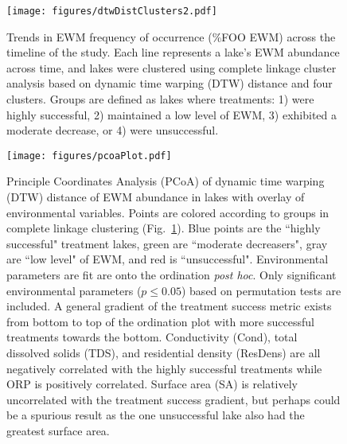 \documentclass{article}
\begin{document}
\begin{figure}[h]
	\centering
	\texttt{[image: figures/dtwDistClusters2.pdf]}
	\captionsetup{justification=raggedright}
	\caption{Trends in EWM frequency of occurrence (\%FOO EWM) across the timeline of the study. Each line represents a lake's EWM abundance across time, and lakes were clustered using complete linkage cluster analysis based on dynamic time warping (DTW) distance and four clusters. Groups are defined as lakes where treatments: 1) were highly successful, 2) maintained a low level of EWM, 3) exhibited a moderate decrease, or 4) were unsuccessful.}
	\label{fig:distClusters}
\end{figure}

\begin{figure}[h]
	\centering
	\texttt{[image: figures/pcoaPlot.pdf]}
	\captionsetup{justification=raggedright}
	\caption{Principle Coordinates Analysis (PCoA) of dynamic time warping (DTW) distance of EWM abundance in lakes with overlay of environmental variables. Points are colored according to groups in complete linkage clustering (Fig.~\ref{fig:distClusters}). Blue points are the ``highly successful" treatment lakes, green are ``moderate decreasers", gray are ``low level" of EWM, and red is ``unsuccessful". Environmental parameters are fit are onto the ordination \emph{post hoc}. Only significant environmental parameters ($p\leq0.05$) based on permutation tests are included. A general gradient of the treatment success metric exists from bottom to top of the ordination plot with more successful treatments towards the bottom. Conductivity (Cond), total dissolved solids (TDS), and residential density (ResDens) are all negatively correlated with the highly successful treatments while ORP is positively correlated. Surface area (SA) is relatively uncorrelated with the treatment success gradient, but perhaps could be a spurious result as the one unsuccessful lake also had the greatest surface area.}
	\label{fig:pcoaPlot}
\end{figure}
\end{document}
